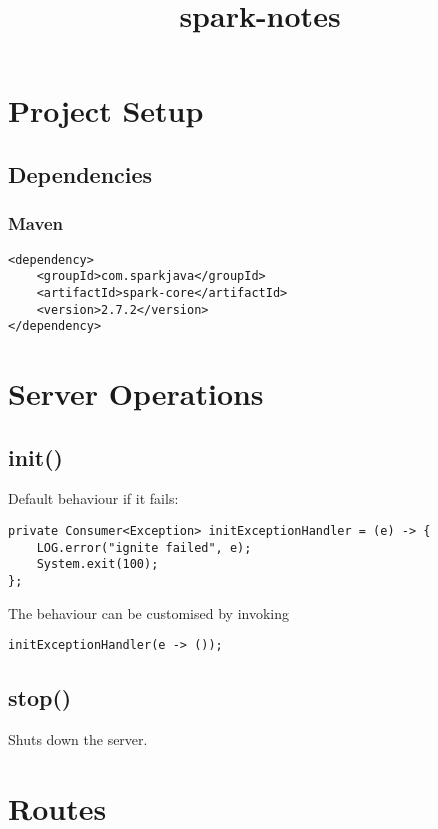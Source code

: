 \documentclass{report}
\title{spark-notes}
\begin{document}
\maketitle
{}
\tableofcontents




\part{Project Setup}



\chapter{Dependencies}

\section{Maven}
\begin{verbatim}
<dependency>
    <groupId>com.sparkjava</groupId>
    <artifactId>spark-core</artifactId>
    <version>2.7.2</version>
</dependency>
\end{verbatim}





\part{Server Operations}



\chapter{init()}
Default behaviour if it fails:
\begin{verbatim}
private Consumer<Exception> initExceptionHandler = (e) -> {
    LOG.error("ignite failed", e);
    System.exit(100);
};
\end{verbatim}

The behaviour can be customised by invoking 
\begin{verbatim}
initExceptionHandler(e -> ());
\end{verbatim}


\chapter{stop()}
Shuts down the server.




\part{Routes}
\end{document}

